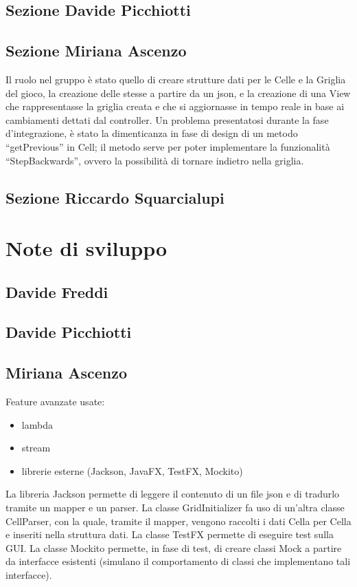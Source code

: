 \documentclass[a4paper,12pt]{report}
\begin{document}
\subsection{Sezione Davide Picchiotti}
\subsection{Sezione Miriana Ascenzo}

Il ruolo nel gruppo è stato quello di creare strutture dati per le Celle e la Griglia del gioco, la creazione delle stesse a partire da un json, e la creazione di una View che rappresentasse la griglia creata e che si aggiornasse in tempo reale in base ai cambiamenti dettati dal controller.
%
Un problema presentatosi durante la fase d’integrazione, è stato la dimenticanza in fase di design di un metodo “getPrevious” in Cell; il metodo serve per poter implementare la funzionalità “StepBackwards”, ovvero la possibilità di tornare indietro nella griglia.

\subsection{Sezione Riccardo Squarcialupi}


\section{Note di sviluppo}

\subsection{Davide Freddi}
\subsection{Davide Picchiotti}
\subsection{Miriana Ascenzo}

Feature avanzate usate:
\begin{itemize}
    \item lambda
    \item stream
    \item librerie esterne (Jackson, JavaFX, TestFX, Mockito)
\end {itemize}
La libreria Jackson permette di leggere il contenuto di un file json e di tradurlo tramite un mapper e un parser.
%
La classe GridInitializer fa uso di un’altra classe CellParser, con la quale, tramite il mapper, vengono raccolti i dati Cella per Cella e inseriti nella struttura dati.
%
La classe TestFX permette di eseguire test sulla GUI.
%
La classe Mockito permette, in fase di test, di creare classi Mock a partire da interfacce esistenti (simulano il comportamento di classi che implementano tali interfacce).
\end{document}
